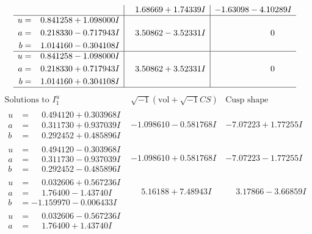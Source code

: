 \documentclass[1p]{elsarticle_modified}
\theoremstyle{definition}
\newcommand{\I}{\sqrt{-1}}
\begin{document}
$$\begin{array}{c|c|c}
 & \phantom{-}1.68669 + 1.74339 I & -1.63098 - 4.10289 I \\ \hline\begin{aligned}
u &= \phantom{-}0.841258 + 1.098000 I \\
a &= \phantom{-}0.218330 - 0.717943 I \\
b &= \phantom{-}1.014160 - 0.304108 I\end{aligned}
 & \phantom{-}3.50862 - 3.52331 I & \phantom{-0.000000 } 0 \\ \hline\begin{aligned}
u &= \phantom{-}0.841258 - 1.098000 I \\
a &= \phantom{-}0.218330 + 0.717943 I \\
b &= \phantom{-}1.014160 + 0.304108 I\end{aligned}
 & \phantom{-}3.50862 + 3.52331 I & \phantom{-0.000000 } 0\\
 \hline 
 \end{array}$$\newpage$$\begin{array}{c|c|c}  
\text{Solutions to }I^u_{1}& \I (\text{vol} + \sqrt{-1}CS) & \text{Cusp shape}\\
 \hline 
\begin{aligned}
u &= \phantom{-}0.494120 + 0.303968 I \\
a &= \phantom{-}0.311730 + 0.937039 I \\
b &= \phantom{-}0.292452 + 0.485896 I\end{aligned}
 & -1.098610 - 0.581768 I & -7.07223 + 1.77255 I \\ \hline\begin{aligned}
u &= \phantom{-}0.494120 - 0.303968 I \\
a &= \phantom{-}0.311730 - 0.937039 I \\
b &= \phantom{-}0.292452 - 0.485896 I\end{aligned}
 & -1.098610 + 0.581768 I & -7.07223 - 1.77255 I \\ \hline\begin{aligned}
u &= \phantom{-}0.032606 + 0.567236 I \\
a &= \phantom{-}1.76400 - 1.43740 I \\
b &= -1.159970 - 0.006433 I\end{aligned}
 & \phantom{-}5.16188 + 7.48943 I & \phantom{-}3.17866 - 3.66859 I \\ \hline\begin{aligned}
u &= \phantom{-}0.032606 - 0.567236 I \\
a &= \phantom{-}1.76400 + 1.43740 I \\

\end{aligned}
\end{array}$$
\end{document}
